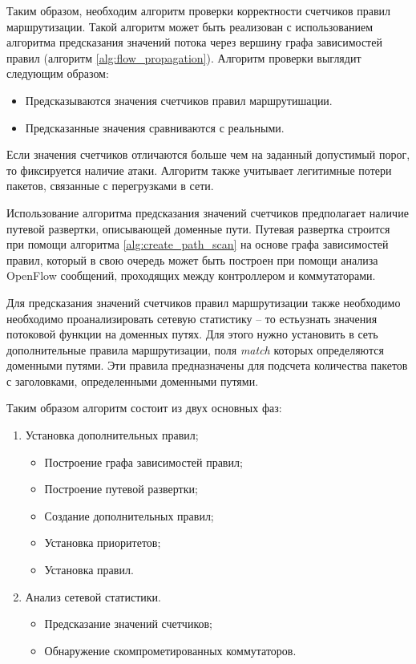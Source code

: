 \documentclass[../thesis.tex]{subfiles}
\begin{document}
Таким образом, необходим алгоритм проверки корректности счетчиков правил маршрутизации.
Такой алгоритм может быть реализован с использованием алгоритма предсказания значений потока через вершину графа зависимостей правил (алгоритм \ref{alg:flow_propagation}).
Алгоритм проверки выглядит следующим образом: 
\begin{itemize}
\item Предсказываются значения счетчиков правил маршрутишации.
\item Предсказанные значения сравниваются с реальными.
\end{itemize}

Если значения счетчиков отличаются больше чем на заданный допустимый порог, то фиксируется наличие атаки.
Алгоритм также учитывает легитимные потери пакетов, связанные с перегрузками в сети.

Использование алгоритма предсказания значений счетчиков предполагает наличие путевой развертки, описывающей доменные пути.
Путевая развертка строится при помощи алгоритма \ref{alg:create_path_scan} на основе графа зависимостей правил, который в свою очередь может быть построен при помощи анализа OpenFlow сообщений, проходящих между контроллером и коммутаторами.

Для предсказания значений счетчиков правил маршрутизации также необходимо необходимо проанализировать сетевую статистику -- то есть\linebreak узнать значения потоковой функции на доменных путях.
Для этого нужно установить в сеть дополнительные правила маршрутизации, поля \textit{match} которых определяются доменными путями.
Эти правила предназначены для подсчета количества пакетов с заголовками, определенными доменными путями.

Таким образом алгоритм состоит из двух основных фаз:
\begin{enumerate}
\item Установка дополнительных правил;
    \begin{itemize}
    \item Построение графа зависимостей правил;
    \item Построение путевой развертки;
    \item Создание дополнительных правил;
    \item Установка приоритетов;
    \item Установка правил.
    \end{itemize}
\item Анализ сетевой статистики.
    \begin{itemize}
    \item Предсказание значений счетчиков;
    \item Обнаружение скомпрометированных коммутаторов.
    \end{itemize}
\end{enumerate}
\end{document}
